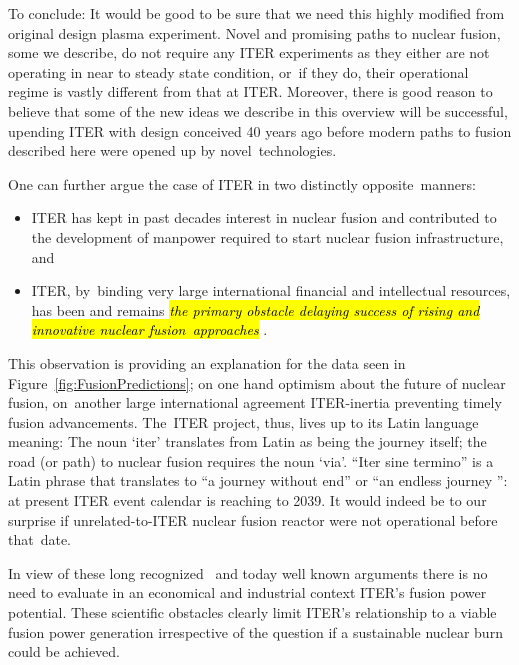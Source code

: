 \documentclass[particles,article,accept,pdftex,moreauthors]{Definitions/mdpi}
\newcommand*{\xblue}{}
\begin{document}
To conclude: It would be good to be sure that we need this highly modified from original design plasma experiment. Novel and promising paths to nuclear fusion, some we describe, do not require any ITER experiments as they either are not operating in near to steady state condition, or~if they do, their operational regime is vastly different from that at ITER. Moreover, there is good reason to believe that some of the new ideas we describe in this overview will be successful, upending ITER with design conceived 40 years ago before modern paths to fusion described here were opened up by novel~technologies.

One can further argue the case of ITER in two distinctly opposite~manners: 
\begin{itemize}
\item ITER has kept in past decades interest in nuclear fusion and contributed to the development of manpower required to start nuclear fusion infrastructure, and~
\item ITER, by~binding very large international financial and intellectual resources, has been and remains {\em \hl{the primary obstacle delaying success of rising and innovative nuclear fusion~approaches}%
}. 
\end{itemize}

This observation is providing an explanation for the data seen in Figure~\ref{fig:FusionPredictions}; on one hand optimism about the future of nuclear fusion, on~another large international agreement ITER-inertia preventing timely fusion advancements. The~ITER project, thus, lives up to its Latin language meaning: The noun `iter' translates from Latin as being the journey itself; the road (or path) to nuclear fusion requires the noun `via'. ``Iter sine termino'' is a Latin phrase that translates to ``a journey without end'' or ``an endless journey '': at present ITER event calendar is reaching to 2039. It would indeed be to our surprise if unrelated-to-ITER nuclear fusion reactor were not operational before that~date.

{\xblue In view of these long recognized~\cite{lidsky1983trouble} and today well known arguments there is no need to evaluate in an economical and industrial context ITER's fusion power potential. These scientific obstacles  clearly limit ITER's relationship to a viable fusion power generation irrespective of the question if a sustainable nuclear burn could be achieved.}
\end{document}
